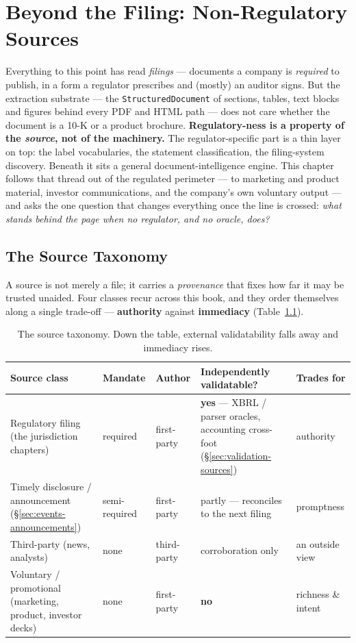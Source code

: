 \documentclass[11pt,a4paper]{report}
\begin{document}
\chapter{Beyond the Filing: Non-Regulatory Sources}
\label{sec:beyond-filing}

Everything to this point has read \emph{filings} --- documents a company is \emph{required} to publish, in a
form a regulator prescribes and (mostly) an auditor signs. But the extraction substrate --- the
\texttt{StructuredDocument} of sections, tables, text blocks and figures behind every PDF and HTML path ---
does not care whether the document is a 10-K or a product brochure. \textbf{Regulatory-ness is a property of
the \emph{source}, not of the machinery.} The regulator-specific part is a thin layer on top: the label
vocabularies, the statement classification, the filing-system discovery. Beneath it sits a general
document-intelligence engine. This chapter follows that thread out of the regulated perimeter --- to
marketing and product material, investor communications, and the company's own voluntary output --- and asks
the one question that changes everything once the line is crossed: \emph{what stands behind the page when no
regulator, and no oracle, does?}

\section{The Source Taxonomy}
\label{sec:source-taxonomy}

A source is not merely a file; it carries a \emph{provenance} that fixes how far it may be trusted unaided.
Four classes recur across this book, and they order themselves along a single trade-off --- \textbf{authority}
against \textbf{immediacy} (Table~\ref{tab:source-taxonomy}).

\begin{table}[h]
\centering\small
\caption{The source taxonomy. Down the table, external validatability falls away and immediacy rises.}
\label{tab:source-taxonomy}
\begin{tabular}{@{}p{}p{}p{}p{}p{}@{}}
\toprule
\textbf{Source class} & \textbf{Mandate} & \textbf{Author} & \textbf{Independently validatable?} & \textbf{Trades for} \\
\midrule
Regulatory filing (the jurisdiction chapters) & required & first-party & \textbf{yes} --- XBRL / parser oracles, accounting cross-foot (\S\ref{sec:validation-sources}) & authority \\
Timely disclosure / announcement (\S\ref{sec:events-announcements}) & semi-required & first-party & partly --- reconciles to the next filing & promptness \\
Third-party (news, analysts) & none & third-party & corroboration only & an outside view \\
Voluntary / promotional (marketing, product, investor decks) & none & first-party & \textbf{no} & richness \& intent \\
\bottomrule
\end{tabular}
\end{table}
\end{document}

